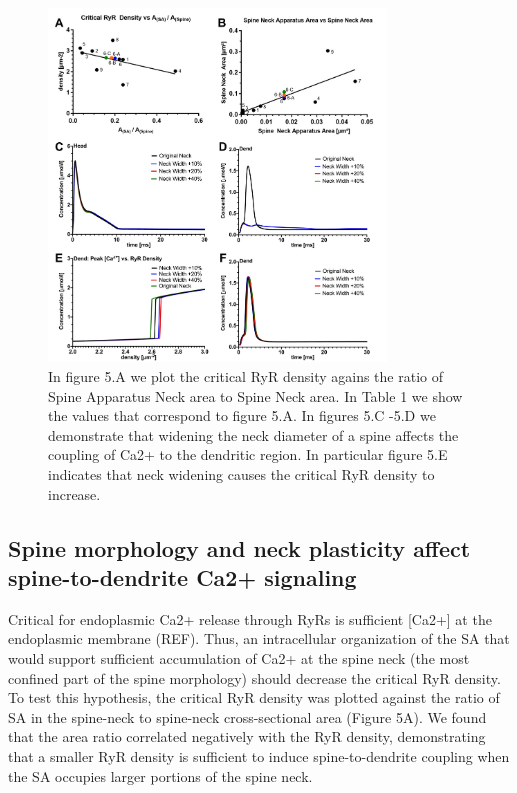\documentclass[fleqn,10pt]{wlscirep}
\begin{document}
\begin{figure}[h!]
\centering
\includegraphics[width=0.8\textwidth]{images/figure5.jpg}
\caption{{\small In figure 5.A we plot the critical RyR density agains the ratio of Spine Apparatus Neck area to Spine Neck area. In Table 1 we show the values that correspond to figure 5.A. In figures 5.C -5.D we demonstrate that widening the neck diameter of a spine affects the coupling of Ca2+ to the dendritic region. In particular figure 5.E indicates that neck widening causes the critical RyR density to increase.}}
\end{figure}

\subsection*{Spine morphology and neck plasticity affect spine-to-dendrite Ca2+ signaling}Critical for endoplasmic Ca2+ release through RyRs is sufficient [Ca2+] at the endoplasmic membrane (REF). Thus, an intracellular organization of the SA that would support sufficient accumulation of Ca2+ at the spine neck (the most confined part of the spine morphology) should decrease the critical RyR density. To test this hypothesis, the critical RyR density was plotted against the ratio of SA in the spine-neck to spine-neck cross-sectional area (Figure 5A). We found that the area ratio correlated negatively with the RyR density, demonstrating that a smaller RyR density is sufficient to induce spine-to-dendrite coupling when the SA occupies larger portions of the spine neck.
\end{document}
